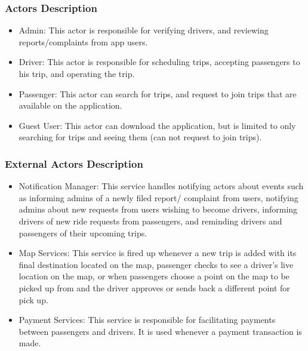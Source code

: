 \documentclass[a4paper, 12pt]{article} %
\begin{document}
        \subsubsection{Actors Description}
            \begin{itemize}
                \item Admin: This actor is responsible for verifying drivers, and reviewing reports/complaints from app users.
                \item Driver: This actor is responsible for scheduling trips, accepting passengers to his trip, and operating the trip.
                \item Passenger: This actor can search for trips, and request to join trips that are available on the application.
                \item Guest User: This actor can download the application, but is limited to only searching for trips and seeing them (can not request to join trips).
            \end{itemize}
        \subsubsection{External Actors Description}
            \begin{itemize}
                \item Notification Manager: This service handles notifying actors about events such as informing admins of a newly filed report/ complaint from users, notifying admins about new requests from users wishing to become drivers, informing drivers of new ride requests from passengers, and reminding drivers and passengers of their upcoming trips.
                \item Map Services: This service is fired up whenever a new trip is added with its final destination located on the map, passenger checks to see a driver’s live location on the map, or when passengers choose a point on the map to be picked up from and the driver approves or sends back a different point for pick up.
                \item Payment Services: This service is responsible for facilitating payments between passengers and drivers. It is used whenever a payment transaction is made.
            \end{itemize}
\end{document}
